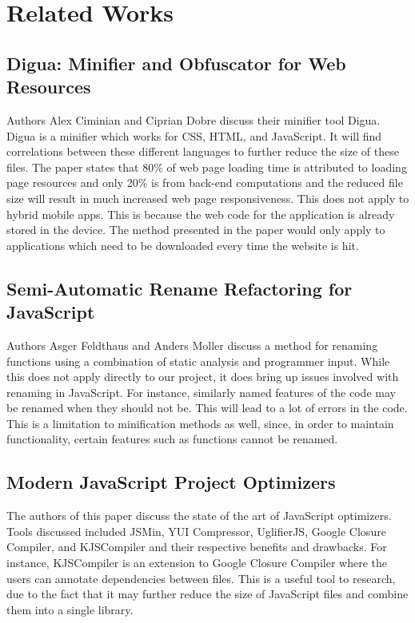 \documentclass{acm_proc_article-sp}
\begin{document}
\section{Related Works}

\subsection{Digua: Minifier and Obfuscator for Web Resources\cite{ciminiandigua} }
Authors Alex Ciminian and Ciprian Dobre discuss their minifier tool Digua. 
Digua is a minifier which works for CSS, HTML, and JavaScript.  
It will find correlations between these different languages to further reduce the size of these files.
The paper states that 80\% of web page loading time is attributed to loading page resources and only 20\% is from back-end computations and the reduced file size will result in much increased web page responsiveness.
This does not apply to hybrid mobile apps.
This is because the web code for the application is already stored in the device.
The method presented in the paper would only apply to applications which need to be downloaded every time the website is hit. 



\subsection{Semi-Automatic Rename Refactoring for JavaScript\cite{feldthaus2013semi}}
Authors Asger Feldthaus and Anders Moller discuss a method for renaming functions using a combination of static analysis and programmer input.
While this does not apply directly to our project, it does bring up issues involved with renaming in JavaScript.
For instance, similarly named features of the code may be renamed when they should not be.
This will lead to a lot of errors in the code.
This is a limitation to minification methods as well, since, in order to maintain functionality, certain features such as functions cannot be renamed.

\subsection{Modern JavaScript Project Optimizers\cite{zolotareva2014modern} }
The authors of this paper discuss the state of the art of JavaScript optimizers.
Tools discussed included JSMin, YUI Compressor, UglifierJS, Google Closure Compiler, and KJSCompiler and their respective benefits and drawbacks.
For instance, KJSCompiler is an extension to Google Closure Compiler where the users can annotate dependencies between files.
This is a useful tool to research, due to the fact that it may further reduce the size of JavaScript files and combine them into a single library.
\end{document}
